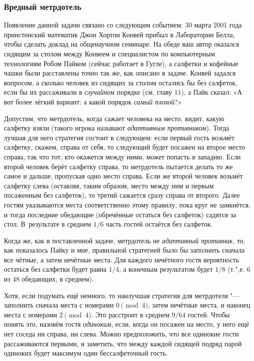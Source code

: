 \documentclass[twoside]{book}
\begin{document}
\subsubsection*{Вредный метрдотель}%

Появление данной задачи связано со следующим событием:
30 марта 2001 года принстонский математик Джон Хортон Конвей %
прибыл в Лаборатории Белла, %
чтобы сделать доклад на общенаучном семинаре. %
На обеде ваш автор оказался сидящим за столом между Конвеем и специалистом по компьютерным технологиям Робом Пайком %
(сейчас работает в Гугле), а салфетки и кофейные чашки были расставлены точно так же, как описано в задаче.
Конвей задался вопросом, а сколько человек из
сидящих за столом остались бы без салфеток, если бы их рассаживали в \emph{случайном} порядке (см. главу 11), а Пайк сказал: «А вот более лёгкий вариант: а какой порядок \emph{самый плохой}?»

\bigskip

Допустим, что метрдотель, когда сажает человека на место, видит, какую салфетку взяли (такого игрока называют \emph{адаптивным противником}). %
Тогда лучшая для него стратегия состоит в следующем:
если первый гость возьмёт салфетку, скажем, справа от себя, то следующий будет посажен на второе место справа, так что тот, кто окажется между ними, может попасть в западню.
Если второй человек берёт салфетку справа, то метрдотель пытается делать то же самое и дальше, пропуская одно место справа.
Если же второй человек возьмёт салфетку слева (оставляя, таким образом, место между ним и первым посаженным без салфеток), то третий сажается сразу справа от второго.
Далее гостям указываются места соответственно этому правилу, пока круг не замкнётся, и тогда последние обедающие (обречённые остаться без салфеток) садятся за стол.
В~результате в среднем $1/6$ часть гостей остаётся без салфеток.

Когда же, как в поставленной задаче, метрдотель не \emph{адаптивный противник}, то, как показалось Пайку и мне, правильной стратегией было бы заполнить сначала все чётные, а затем нечётные места.
Для каждого нечётного гостя вероятность остаться без салфетки будет равна $1/4$, %
а конечным результатом будет $1/8$ (т.",е. 6 из 48 обедающих, в среднем).

Хотя, если подумать ещё немного, то наилучшая стратегия для метрдотеля "--- заполнить сначала места с номерами $0\pmod4$, затем нечётные места, и наконец места с номерами $2\pmod4$.
Это расстроит в среднем $9/64$ гостей.
Чтобы понять это, назовём гостя \emph{одиноким}, если, когда он посажен на место, у него ещё нет соседа ни справа, ни слева.
Можно предположить, что все одинокие гости рассаживаются первыми, и заметить, что между каждой сидящей подряд парой одиноких будет максимум один бессалфеточный гость.
\end{document}
